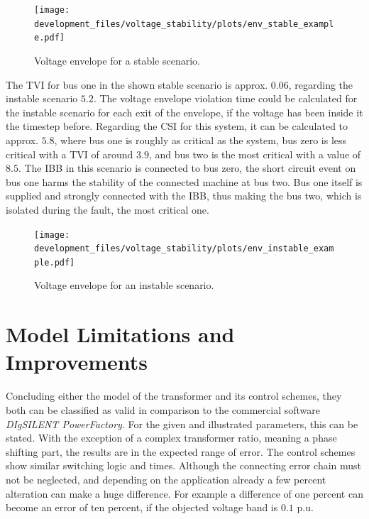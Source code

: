 \begin{figure}[htbp!]
    \centering
    \texttt{[image: development\_files/voltage\_stability/plots/env\_stable\_example.pdf]}
    \caption[Voltage envelope for a stable scenario]{Voltage envelope for a stable scenario.}
    \label{fig:env-stable}
\end{figure}

The \acs{TVI} for bus one in the shown stable scenario is approx. $0.06$, regarding the instable scenario $5.2$.
The voltage envelope violation time could be calculated for the instable scenario for each exit of the envelope, if the voltage has been inside it the timestep before.
Regarding the \acs{CSI} for this system, it can be calculated to approx. $5.8$, where bus one is roughly as critical as the system, bus zero is less critical with a \acs{TVI} of around $3.9$, and bus two is the most critical with a value of $8.5$.
The \acs{IBB} in this scenario is connected to bus zero, the short circuit event on bus one harms the stability of the connected machine at bus two. 
Bus one itself is supplied and strongly connected with the \acs{IBB}, thus making the bus two, which is isolated during the fault, the most critical one.

\begin{figure}[htbp!]
    \centering
    \texttt{[image: development\_files/voltage\_stability/plots/env\_instable\_example.pdf]}
    \caption[Voltage envelope for an instable scenario]{Voltage envelope for an instable scenario.}
    \label{fig:env-instable}
\end{figure}

\section{Model Limitations and Improvements}

Concluding either the model of the transformer and its control schemes, they both can be classified as valid in comparison to the commercial software \textit{DIgSILENT PowerFactory}.
For the given and illustrated parameters, this can be stated.
With the exception of a complex transformer ratio, meaning a phase shifting part, the results are in the expected range of error.
The control schemes show similar switching logic and times.
Although the connecting error chain must not be neglected, and depending on the application already a few percent alteration can make a huge difference.
For example a difference of one percent can become an error of ten percent, if the objected voltage band is $0.1$ p.u.

